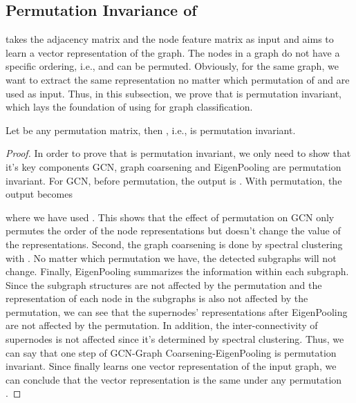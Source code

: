 \documentclass[sigconf]{acmart}
\newcommand{\m}{{\sf {EigenGCN}}}
\begin{document}
\subsection{Permutation Invariance of \m}
 takes the adjacency matrix  and the node feature matrix  as input and aims to learn a vector representation of the graph. The nodes in a graph do not have a specific ordering, i.e.,  and  can be permuted. Obviously, for the same graph, we want  to extract the same representation no matter which permutation of  and  are used as input. Thus, in this subsection, we prove that  is permutation invariant, which lays the foundation of using  for graph classification.
\begin{theorem}
    Let  be any permutation matrix, then , i.e.,  is permutation invariant.
\end{theorem}
\vspace{-1em}
\begin{proof}
    In order to prove that  is permutation invariant, we only need to show that it's key components GCN, graph coarsening and EigenPooling are permutation invariant. For GCN, before permutation, the output is . With permutation, the output becomes
    
where we have used . This shows that the effect of permutation on GCN only permutes the order of the node representations but doesn't change the value of the representations. Second, the graph coarsening is done by spectral clustering with . No matter which permutation we have, the detected subgraphs will not change. Finally, EigenPooling summarizes the information within each subgraph. Since the subgraph structures are not affected by the permutation and the representation of each node in the subgraphs is also not affected by the permutation, we can see that the supernodes' representations after EigenPooling are not affected by the permutation. In addition, the inter-connectivity of supernodes is not affected since it's determined by spectral clustering. Thus, we can say that one step of GCN-Graph Coarsening-EigenPooling is permutation invariant. Since finally  learns one vector representation of the input graph, we can conclude that the vector representation is the same under any permutation . 
\end{proof}
\end{document}
